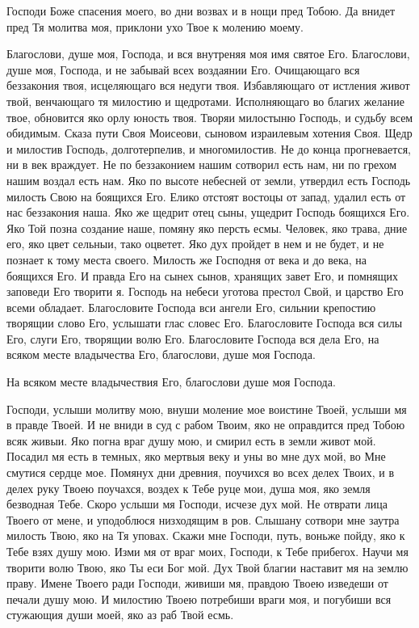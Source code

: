 Господи Боже спасения моего, во дни возвах и в нощи пред Тобою. Да внидет пред Тя молитва моя, приклони ухо Твое к молению моему.




Благослови, душе моя, Господа, и вся внутреняя моя имя святое Его. Благослови, душе моя, Господа, и не забывай всех воздаянии Его. Очищающаго вся беззакония твоя, исцеляющаго вся недуги твоя. Избавляющаго от истления живот твой, венчающаго тя милостию и щедротами. Исполняющаго во благих желание твое, обновится яко орлу юность твоя. Творяи милостыню Господь, и судьбу всем обидимым. Сказа пути Своя Моисеови, сыновом израилевым хотения Своя. Щедр и милостив Господь, долготерпелив, и многомилостив. Не до конца прогневается, ни в век враждует. Не по беззаконием нашим сотворил есть нам, ни по грехом нашим воздал есть нам. Яко по высоте небесней от земли, утвердил есть Господь милость Свою на боящихся Его. Елико отстоят востоцы от запад, удалил есть от нас беззакония наша. Яко же щедрит отец сыны, ущедрит Господь боящихся Его. Яко Той позна создание наше, помяну яко персть есмы. Человек, яко трава, дние его, яко цвет сельныи, тако оцветет. Яко дух пройдет в нем и не будет, и не познает к тому места своего. Милость же Господня от века и до века, на боящихся Его. И правда Его на сынех сынов, хранящих завет Его, и помнящих заповеди Его творити я. Господь на небеси уготова престол Свой, и царство Его всеми обладает. Благословите Господа вси ангели Его, сильнии крепостию творящии слово Его, услышати глас словес Его. Благословите Господа вся силы Его, слуги Его, творящии волю Его. Благословите Господа вся дела Его, на всяком месте владычества Его, благослови, душе моя Господа.

На всяком месте владычествия Его, благослови душе моя Господа.




Господи, услыши молитву мою, внуши моление мое воистине Твоей, услыши мя в правде Твоей. И не вниди в суд с рабом Твоим, яко не оправдится пред Тобою всяк живыи. Яко погна враг душу мою, и смирил есть в земли живот мой. Посадил мя есть в темных, яко мертвыя веку и уны во мне дух мой, во Мне смутися сердце мое. Помянух дни древния, поучихся во всех делех Твоих, и в делех руку Твоею поучахся, воздех к Тебе руце мои, душа моя, яко земля безводная Тебе. Скоро услыши мя Господи, исчезе дух мой. Не отврати лица Твоего от мене, и уподоблюся низходящим в ров. Слышану сотвори мне заутра милость Твою, яко на Тя уповах. Скажи мне Господи, путь, воньже пойду, яко к Тебе взях душу мою. Изми мя от враг моих, Господи, к Тебе прибегох. Научи мя творити волю Твою, яко Ты еси Бог мой. Дух Твой благии наставит мя на землю праву. Имене Твоего ради Господи, живиши мя, правдою Твоею изведеши от печали душу мою. И милостию Твоею потребиши враги моя, и погубиши вся стужающия души моей, яко аз раб Твой есмь.

